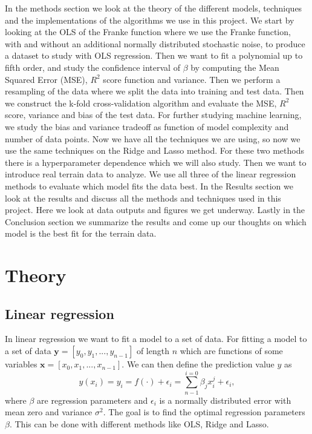 \documentclass[12pt,a4paper,english]{article}
\begin{document}
In the methods section we look at the theory of the different models, techniques and the implementations of the algorithms we use in this project. We start by looking at the OLS of the Franke function where we use the Franke function, with and without an additional normally distributed stochastic noise, to produce a dataset to study with OLS regression. Then we want to fit a polynomial up to fifth order, and study the confidence interval of $\beta$ by computing the Mean Squared Error (MSE), $R^2$ score function and variance. Then we perform a resampling of the data where we split the data into training and test data. Then we construct the k-fold cross-validation algorithm and evaluate the MSE, $R^2$ score, variance and bias of the test data. For further studying machine learning, we study the bias and variance tradeoff as function of model complexity and number of data points. Now we have all the techniques we are using, so now we use the same techniques on the Ridge and Lasso method. For these two methods there is a hyperparameter dependence which we will also study. Then we want to introduce real terrain data to analyze. We use all three of the linear regression methods to evaluate which model fits the data best. In the Results section we look at the results and discuss all the methods and techniques used in this project. Here we look at data outputs and figures we get underway. Lastly in the Conclusion section we summarize the results and come up our thoughts on which model is the best fit for the terrain data.

\section{Theory}
\subsection{Linear regression}
In linear regression we want to fit a model to a set of data. For fitting a model to a set of data $\textbf{y}=[y_0, y_1,...,y_{n-1}]$ of length $n$ which are functions of some variables $\textbf{x}=[x_0, x_1,...,x_{n-1}]$. We can then define the prediction value $y$ as
\begin{equation}
\label{eq:pred_y}
y(x_i)=y_i=f(\cdot)+\epsilon_i=\sum_{n-1}^{i=0}\beta_jx_i^j+\epsilon_i,
\end{equation}
where $\beta$ are regression parameters and $\epsilon_i$ is a normally distributed error with mean zero and variance $\sigma^2$. The goal is to find the optimal regression parameters $\beta$. This can be done with different methods like OLS, Ridge and Lasso.
\end{document}

